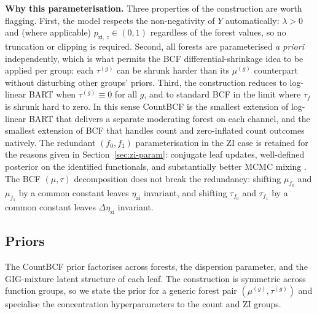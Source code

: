 \documentclass[11pt]{article}
\theoremstyle{plain}
\theoremstyle{definition}
\theoremstyle{remark}
\newcommand{\tauF}{\tau_f}
\newcommand{\pzi}[1][z]{p_{\mathrm{zi},\,#1}}
\newcommand{\etazi}{\eta_{\mathrm{zi}}}
\newcommand{\Detazi}{\Delta\etazi}
\newcommand{\fzeroSym}{f_{0}}
\newcommand{\foneSym}{f_{1}}
\newcommand{\muFzero}{\mu_{f_{0}}}
\newcommand{\muFone}{\mu_{f_{1}}}
\newcommand{\tauFzero}{\tau_{f_{0}}}
\newcommand{\tauFone}{\tau_{f_{1}}}
\begin{document}
\medskip
\noindent\textbf{Why this parameterisation.}
Three properties of the construction are worth flagging. First, the
model respects the non-negativity of $Y$ automatically: $\lambda > 0$
and (where applicable) $\pzi \in (0, 1)$ regardless of the forest
values, so no truncation or clipping is required. Second, all forests
are parameterised \emph{a priori} independently, which is what
permits the BCF differential-shrinkage idea
\citep[\S2.3]{hahn2020bayesian} to be applied per group: each
$\tau^{(g)}$ can be shrunk harder than its $\mu^{(g)}$ counterpart
without disturbing other groups' priors. Third, the construction
reduces to log-linear BART \citep{murray2021loglinear} when
$\tau^{(g)} \equiv 0$ for all $g$, and to standard BCF in the limit
where $\tauF$ is shrunk hard to zero. In this sense CountBCF is the
smallest extension of log-linear BART that delivers a separate
moderating forest on each channel, and the smallest extension of BCF
that handles count and zero-inflated count outcomes natively. The
redundant $(\fzeroSym, \foneSym)$ parameterisation in the ZI case is
retained for the reasons given in Section~\ref{sec:zi-param}:
conjugate leaf updates, well-defined posterior on the identified
functionals, and substantially better MCMC mixing
\citep[Supplement~\S A]{murray2021loglinear}. The BCF $(\mu, \tau)$
decomposition does not break the redundancy: shifting $\muFzero$ and
$\muFone$ by a common constant leaves $\etazi$ invariant, and shifting
$\tauFzero$ and $\tauFone$ by a common constant leaves $\Detazi$
invariant.

\subsection{Priors}\label{sec:priors}

The CountBCF prior factorises across forests, the dispersion
parameter, and the GIG-mixture latent structure of each leaf. The
construction is symmetric across function groups, so we state the
prior for a generic forest pair $(\mu^{(g)}, \tau^{(g)})$ and
specialise the concentration hyperparameters to the count and ZI
groups.
\end{document}
